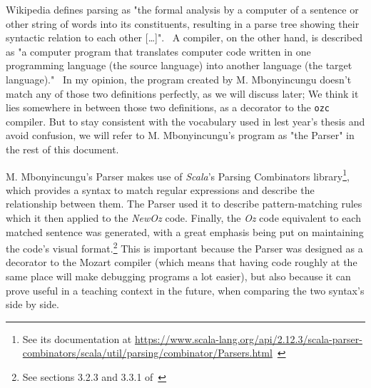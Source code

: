 Wikipedia defines parsing as "the formal analysis by a computer of a sentence or other string of words into its constituents, resulting in a parse tree showing their syntactic relation to each other [\ldots]".~\cite{wikiParser}
A compiler, on the other hand, is described as "a computer program that translates computer code written in one programming language (the source language) into another language (the target language)."~\cite{wikiCompiler}
In my opinion, the program created by M. Mbonyincungu doesn't match any of those two definitions perfectly, as we will discuss later;
We think it lies somewhere in between those two definitions, as a decorator to the \texttt{ozc} compiler.
But to stay consistent with the vocabulary used in lest year's thesis and avoid confusion, we will refer to M. Mbonyincungu's program as "the Parser" in the rest of this document.\newline

M. Mbonyincungu's Parser makes use of \textit{Scala}'s Parsing Combinators library\footnote{See its documentation at \url{https://www.scala-lang.org/api/2.12.3/scala-parser-combinators/scala/util/parsing/combinator/Parsers.html}~\cite{ScalaParsers}}, which provides a syntax to match regular expressions and describe the relationship between them.
The Parser used it to describe pattern-matching rules which it then applied to the \textit{NewOz} code.
Finally, the \textit{Oz} code equivalent to each matched sentence was generated, with a great emphasis being put on maintaining the code's visual format.\footnote{See sections 3.2.3 and 3.3.1 of~\cite{jpthesis}}
This is important because the Parser was designed as a decorator to the Mozart compiler (which means that having code roughly at the same place will make debugging programs a lot easier), but also because it can prove useful in a teaching context in the future, when comparing the two syntax's side by side.\newline

